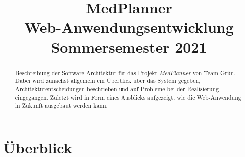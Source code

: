\documentclass[conference]{IEEEtran}
\begin{document}
\title{MedPlanner\\
{\large Web-Anwendungsentwicklung Sommersemester 2021}
}

\author{
\and
{}
\and
{}
\and
{}
\and
{}
}

\maketitle

\begin{abstract}
Beschreibung der Software-Architektur für das Projekt \textit{MedPlanner} von Team Grün. Dabei wird zunächst allgemein ein Überblick über das System gegeben, Architekturentscheidungen beschrieben und auf Probleme bei der Realisierung eingegangen. Zuletzt wird in Form eines Ausblicks aufgezeigt, wie die Web-Anwendung in Zukunft ausgebaut werden kann.
\end{abstract}



\section{Überblick}
\end{document}

